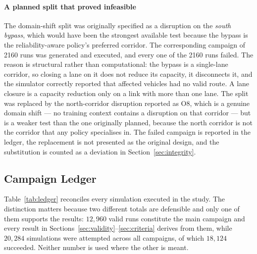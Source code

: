 \documentclass[preprint,12pt]{elsarticle}
\begin{document}
\paragraph{A planned split that proved infeasible}
The domain-shift split was originally specified as a disruption on the
\emph{south bypass}, which would have been the strongest available test because
the bypass is the reliability-aware policy's preferred corridor. The
corresponding campaign of 2160 runs was generated and executed, and every one of
the 2160 runs failed. The reason is structural rather than computational: the
bypass is a single-lane corridor, so closing a lane on it does not reduce its
capacity, it disconnects it, and the simulator correctly reported that affected
vehicles had no valid route. A lane closure is a capacity reduction only on a
link with more than one lane. The split was replaced by the north-corridor
disruption reported as O8, which is a genuine domain shift --- no training
context contains a disruption on that corridor --- but is a weaker test than the
one originally planned, because the north corridor is not the corridor that any
policy specialises in. The failed campaign is reported in the ledger, the
replacement is not presented as the original design, and the substitution is
counted as a deviation in Section~\ref{sec:integrity}.

\subsection{Campaign Ledger}
\label{sec:design:ledger}

Table~\ref{tab:ledger} reconciles every simulation executed in the study. The
distinction matters because two different totals are defensible and only one of
them supports the results: $12{,}960$ valid runs constitute the main campaign and
every result in Sections~\ref{sec:validity}--\ref{sec:criteria} derives from
them, while $20{,}284$ simulations were attempted across all campaigns, of which
$18{,}124$ succeeded. Neither number is used where the other is meant.
\end{document}
